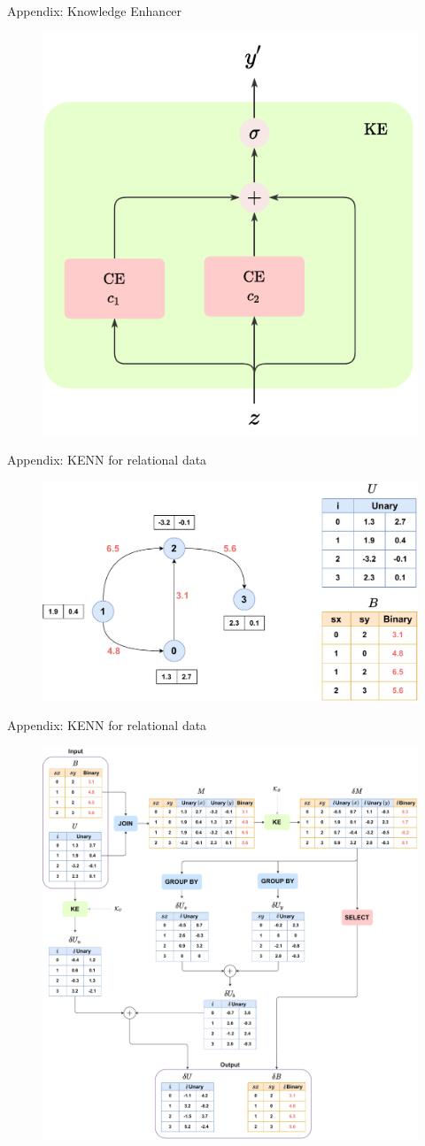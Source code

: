 \documentclass{beamer}
\begin{document}
\begin{frame}{Appendix: Knowledge Enhancer}
	\begin{figure}
		\centering
		\includegraphics[width=0.55\linewidth]{images/KE.pdf}
	\end{figure}
\end{frame}

\begin{frame}{Appendix: KENN for relational data}
	\begin{figure}
		\includegraphics[width=0.9\linewidth]{images/kenn_relational_representation2.pdf}
	\end{figure}
\end{frame}

\begin{frame}{Appendix: KENN for relational data}
	\begin{figure}
		\includegraphics[width=0.65\linewidth]{images/kenn_relational_global_chart.pdf}
	\end{figure}
\end{frame}
\end{document}
